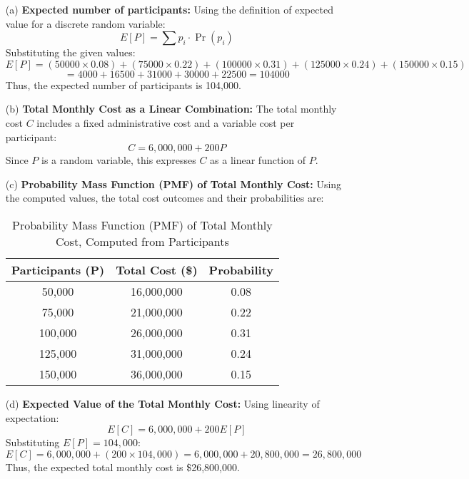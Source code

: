 \documentclass{article}
\begin{document}
\begin{enumerate}

    \item[(a)] \textbf{Expected number of participants:}
    Using the definition of expected value for a discrete random variable:
    \[
    E[P] = \sum p_i \cdot \Pr(p_i)
    \]
    Substituting the given values:
    \[
    E[P] = (50000 \times 0.08) + (75000 \times 0.22) + (100000 \times 0.31) + (125000 \times 0.24) + (150000 \times 0.15)
    \]
    \[
    = 4000 + 16500 + 31000 + 30000 + 22500 = 104000
    \]
    Thus, the expected number of participants is 104,000.

    \item[(b)] \textbf{Total Monthly Cost as a Linear Combination:}
    The total monthly cost \( C \) includes a fixed administrative cost and a variable cost per participant:
    \[
    C = 6,000,000 + 200P
    \]
    Since \( P \) is a random variable, this expresses \( C \) as a linear function of \( P \).

    \item[(c)] \textbf{Probability Mass Function (PMF) of Total Monthly Cost:}
    Using the computed values, the total cost outcomes and their probabilities are:

\begin{table}[H]
    \centering
    \begin{tabular}{c|c|c}
        \hline
        \textbf{Participants (P)} & \textbf{Total Cost (\$)} & \textbf{Probability} \\
        \hline
        50,000 & 16,000,000 & 0.08 \\
        75,000 & 21,000,000 & 0.22 \\
        100,000 & 26,000,000 & 0.31 \\
        125,000 & 31,000,000 & 0.24 \\
        150,000 & 36,000,000 & 0.15 \\
        \hline
    \end{tabular}
    \caption{Probability Mass Function (PMF) of Total Monthly Cost, Computed from Participants}
    \label{tab:pmf_total_cost}
\end{table}


    \item[(d)] \textbf{Expected Value of the Total Monthly Cost:}
    Using linearity of expectation:
    \[
    E[C] = 6,000,000 + 200E[P]
    \]
    Substituting \( E[P] = 104,000 \):
    \[
    E[C] = 6,000,000 + (200 \times 104,000) = 6,000,000 + 20,800,000 = 26,800,000
    \]
    Thus, the expected total monthly cost is \$26,800,000.


\end{enumerate}
\end{document}
